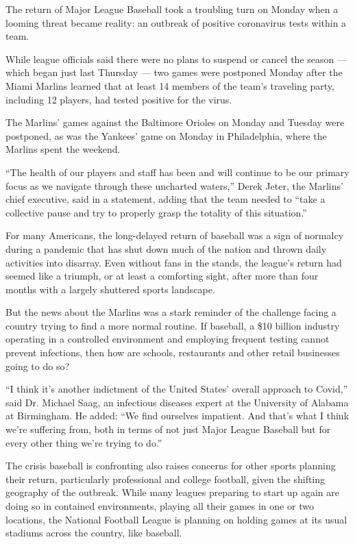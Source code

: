 The return of Major League Baseball took a troubling turn on Monday when
a looming threat became reality: an outbreak of positive coronavirus
tests within a team.

While league officials said there were no plans to suspend or cancel the
season --- which began just last Thursday --- two games were postponed
Monday after the Miami Marlins learned that at least 14 members of the
team's traveling party, including 12 players, had tested positive for
the virus.

The Marlins' games against the Baltimore Orioles on Monday and Tuesday
were postponed, as was the Yankees' game on Monday in Philadelphia,
where the Marlins spent the weekend.

``The health of our players and staff has been and will continue to be
our primary focus as we navigate through these uncharted waters,'' Derek
Jeter, the Marlins' chief executive, said in a statement, adding that
the team needed to ``take a collective pause and try to properly grasp
the totality of this situation.''

For many Americans, the long-delayed return of baseball was a sign of
normalcy during a pandemic that has shut down much of the nation and
thrown daily activities into disarray. Even without fans in the stands,
the league's return had seemed like a triumph, or at least a comforting
sight, after more than four months with a largely shuttered sports
landscape.

But the news about the Marlins was a stark reminder of the challenge
facing a country trying to find a more normal routine. If baseball, a
\$10 billion industry operating in a controlled environment and
employing frequent testing cannot prevent infections, then how are
schools, restaurants and other retail businesses going to do so?

``I think it's another indictment of the United States' overall approach
to Covid,'' said Dr. Michael Saag, an infectious diseases expert at the
University of Alabama at Birmingham. He added: ``We find ourselves
impatient. And that's what I think we're suffering from, both in terms
of not just Major League Baseball but for every other thing we're trying
to do.''

The crisis baseball is confronting also raises concerns for other sports
planning their return, particularly professional and college football,
given the shifting geography of the outbreak. While many leagues
preparing to start up again are doing so in contained environments,
playing all their games in one or two locations, the National Football
League is planning on holding games at its usual stadiums across the
country, like baseball.

